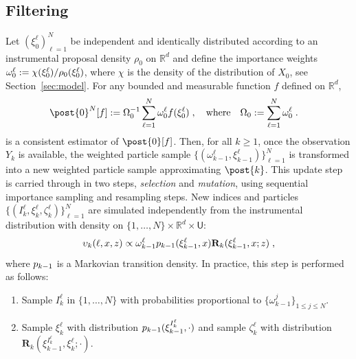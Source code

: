 \documentclass{article}
\newcommand{\N}{N}
\newcommand{\kissforward}[3][]
{\ifthenelse{\equal{#1}{}}{p_{#2}}
{\ifthenelse{\equal{#1}{fully}}{p^{\star}_{#2}}
{\ifthenelse{\equal{#1}{smooth}}{\tilde{r}_{#2}}{\mathrm{erreur}}}}}
\newcommand{\instrpostaux}[1]{\ensuremath{\upsilon_{#1}}}
\newcommand{\XinitIS}[2][]
{\ifthenelse{\equal{#1}{}}{\ensuremath{\rho_{#2}}}{\ensuremath{\check{\rho}_{#2}}}}
\newcommand{\adjfuncforward}[1]{\vartheta_{#1}}
\newcommand{\eqdef}{\ensuremath{:=}}
\newcommand{\eqsp}{\;}
\newcommand{\ewght}[2]{\ensuremath{\omega_{#1}^{#2}}}
\newcommand{\epart}[2]{\ensuremath{\xi_{#1}^{#2}}}
\newcommand{\Xinit}{\ensuremath{\chi}}
\newcommand{\sumwght}[2][]{%
\ifthenelse{\equal{#1}{}}{\ensuremath{\Omega_{#2}}}{\ensuremath{\Omega_{#2}^{(#1)}}}}
\newcommand{\marginalset}{\mathsf{U}}
\newcommand{\kernelmarg}{\mathbf{R}}
\begin{document}
\subsection{Filtering}
\label{sec:filtering}
Let $(\epart{0}{\ell})_{\ell = 1}^\N$ be independent and identically distributed according to an instrumental proposal density $\rho_0$ on $\mathbb{R}^d$ and define the importance weights $\ewght{0}{\ell} \eqdef \Xinit(\epart{0}{\ell})/\XinitIS{0}(\epart{0}{\ell})$, where $\chi$ is the density of the distribution of $X_0$, see Section~\ref{sec:model}. For any bounded and measurable function  $f$ defined on $\mathbb{R}^d$,
\begin{align*}
\post{0}^\N[f]&\eqdef \sumwght{0}^{-1}\sum_{\ell=1}^\N \ewght{0}{\ell}f(\epart{0}{\ell})\eqsp,\quad\mbox{where}\quad\sumwght{0}\eqdef \sum_{\ell=1}^N \ewght{0}{\ell}\eqsp.
\end{align*}
is a consistent estimator of $\post{0}[f]$. Then, for all $k\geqslant 1$, once the observation $Y_k$ is available, the weighted particle sample $\{(\ewght{k-1}{\ell},\epart{k-1}{\ell})\}_{\ell=1}^{\N}$ is transformed into a new weighted particle sample approximating $\post{k}$.
 This update step is carried through in two steps, \emph{selection} and \emph{mutation},  using sequential importance sampling and resampling steps. %
 New indices and particles $\{ (I_k^{\ell}, \epart{k}{\ell},\zeta_k^{\ell}) \}_{\ell = 1}^\N$ are simulated independently from the instrumental distribution with density on $\{1, \dots, \N\} \times \mathbb{R}^d\times \marginalset$:
$$
\instrpostaux{k}(\ell,x,z) \propto \ewght{k-1}{\ell} 
\kissforward{k-1}{k-1}(\epart{k-1}{\ell},x) \kernelmarg_{k}(\epart{k-1}{\ell},x;z) \eqsp,
$$
where 
$\kissforward{k-1}{k-1}$ is a Markovian transition density.  In practice, this step is performed as follows:
\begin{enumerate}
\item Sample $I_k^{\ell}$ in $\{1,\ldots,N\}$ with probabilities proportional to $\{\ewght{k-1}{j}
\}_{1\leqslant j\leqslant \N}$.
\item Sample $\epart{k}{\ell}$ with distribution $\kissforward{k-1}{k-1}(\epart{k-1}{I_k^{\ell}},\cdot)$ and sample $\zeta_k^{\ell}$ with distribution $\kernelmarg_{k}(\epart{k-1}{I_k^{\ell}},\epart{k}{\ell};\cdot)$.
\end{enumerate}
\end{document}
